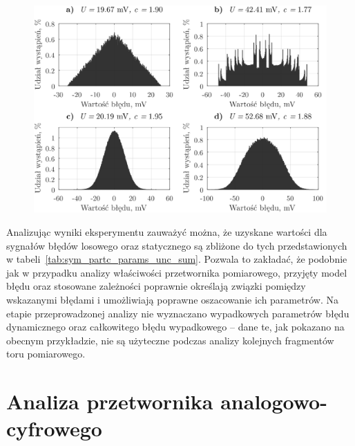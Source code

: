 \begin{figure}[htb!]
\begin{center}
\includegraphics{obrazki/hist_part_b}
\end{center}
\end{figure}

Analizując wyniki eksperymentu zauważyć można, że uzyskane wartości dla sygnałów błędów losowego oraz statycznego są zbliżone do tych przedstawionych w tabeli~\ref{tab:sym_partc_params_unc_sum}. Pozwala to zakładać, że podobnie jak w przypadku analizy właściwości przetwornika pomiarowego, przyjęty model błędu oraz stosowane zależności poprawnie określają związki pomiędzy wskazanymi błędami i umożliwiają poprawne oszacowanie ich parametrów. Na etapie przeprowadzonej analizy nie wyznaczano wypadkowych parametrów błędu dynamicznego oraz całkowitego błędu wypadkowego -- dane te, jak pokazano na obecnym przykładzie, nie są użyteczne podczas analizy kolejnych fragmentów toru pomiarowego.

\section{Analiza przetwornika analogowo-cyfrowego}

